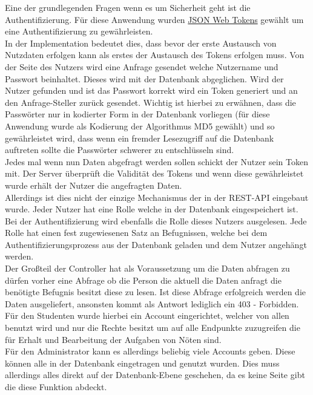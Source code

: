Eine der grundlegenden Fragen wenn es um Sicherheit geht ist die Authentifizierung. Für diese Anwendung wurden \hyperref[JWT]{JSON Web Tokens} gewählt um eine Authentifizierung zu gewährleisten. \\
In der Implementation bedeutet dies, dass bevor der erste Austausch von Nutzdaten erfolgen kann als erstes der Austausch des Tokens erfolgen muss. Von der Seite des Nutzers wird eine Anfrage gesendet welche Nutzername und Passwort beinhaltet. Dieses wird mit der Datenbank abgeglichen. Wird der Nutzer gefunden und ist das Passwort korrekt wird ein Token generiert und an den Anfrage-Steller zurück gesendet. Wichtig ist hierbei zu erwähnen, dass die Passwörter nur in kodierter Form in der Datenbank vorliegen (für diese Anwendung wurde als Kodierung der Algorithmus MD5 gewählt) und so gewährleistet wird, dass wenn ein fremder Lesezugriff auf die Datenbank auftreten sollte die Passwörter schwerer zu entschlüsseln sind. \\
Jedes mal wenn nun Daten abgefragt werden sollen schickt der Nutzer sein Token mit. Der Server überprüft die Validität des Tokens und wenn diese gewährleistet wurde erhält der Nutzer die angefragten Daten. \\

Allerdings ist dies nicht der einzige Mechanismus der in der REST-API eingebaut wurde. Jeder Nutzer hat eine Rolle welche in der Datenbank eingespeichert ist. Bei der Authentifizierung wird ebenfalls die Rolle dieses Nutzers ausgelesen. Jede Rolle hat einen fest zugewiesenen Satz an Befugnissen, welche bei dem Authentifizierungsprozess aus der Datenbank geladen und dem Nutzer angehängt werden. \\
Der Großteil der Controller hat als Voraussetzung um die Daten abfragen zu dürfen vorher eine Abfrage ob die Person die aktuell die Daten anfragt die benötigte Befugnis besitzt diese zu lesen. Ist diese Abfrage erfolgreich werden die Daten ausgeliefert, ansonsten kommt als Antwort lediglich ein 403 - Forbidden. \\

Für den Studenten wurde hierbei ein Account eingerichtet, welcher von allen benutzt wird und nur die Rechte besitzt um auf alle Endpunkte zuzugreifen die für Erhalt und Bearbeitung der Aufgaben von Nöten sind. \\

Für den Administrator kann es allerdings beliebig viele Accounts geben. Diese können alle in der Datenbank eingetragen und genutzt wurden. Dies muss allerdings alles direkt auf der Datenbank-Ebene geschehen, da es keine Seite gibt die diese Funktion abdeckt.

